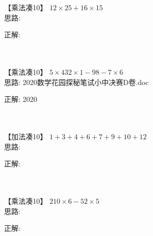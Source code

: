 



\item {
    【乘法凑10】
    $12\times 25 + 16\times 15$
    \ifshowSolution
        \fangsong{}
        \\
        思路:

        正解: 
    \else
        \\ \\ \\
    \fi
}

\item {
    【乘法凑10】
    $5\times 432\times 1 - 98 - 7\times 6$
    \ifshowSolution
        \fangsong{}
        \\
        思路: 2020数学花园探秘笔试小中决赛D卷.doc

        正解: 2020
    \else
        \\ \\ \\
    \fi
}

\item {
    【加法凑10】
    $1+3+4+6+7+9+10 + 12$
    \ifshowSolution
        \fangsong{}
        \\
        思路:

        正解: 
    \else
        \\ \\ \\
    \fi
}

\item {
    【乘法凑10】
    $210\times 6 - 52\times 5$
    \ifshowSolution
        \fangsong{}
        \\
        思路:

        正解: 
    \else
        \\ \\ \\
    \fi
}

